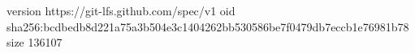 version https://git-lfs.github.com/spec/v1
oid sha256:bcdbedb8d221a75a3b504e3c1404262bb530586be7f0479db7eccb1e76981b78
size 136107
